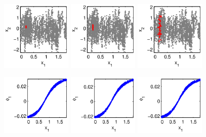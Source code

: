 \begin{figure}[t]
\includegraphics[width=0.3\textwidth]{data_linear_burst1}
\includegraphics[width=0.3\textwidth]{data_linear_burst2}
\includegraphics[width=0.3\textwidth]{data_linear_burst3}

\includegraphics[width=0.3\textwidth]{data_linear_slow1}
\includegraphics[width=0.3\textwidth]{data_linear_slow2}
\includegraphics[width=0.3\textwidth]{data_linear_slow3}


\end{figure}
